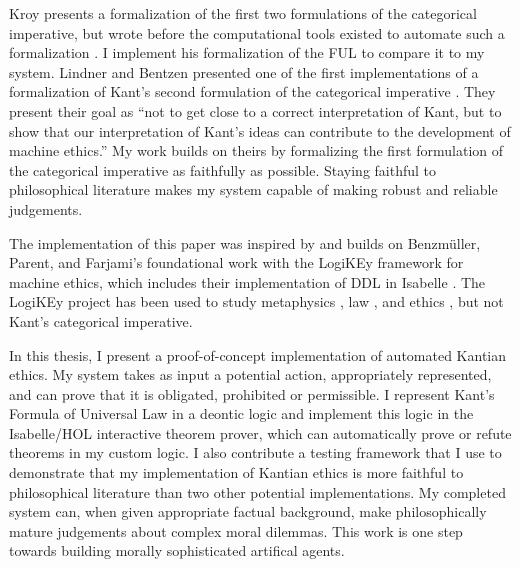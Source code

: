 \begin{isabellebody}
\begin{isamarkuptext}
Kroy presents a formalization of the first two formulations of the categorical imperative, but wrote 
before the computational tools existed to automate such a formalization \citep{kroy}. I implement his formalization of the FUL to compare it to my system. 
Lindner and Bentzen presented one of the first implementations of a formalization of 
Kant's second formulation of the categorical imperative \citep{BL}. They present their goal as ``not to get 
close to a correct interpretation of Kant, but to show that our interpretation of Kant’s ideas can 
contribute to the development of machine ethics.'' My work builds on theirs by formalizing the 
first formulation of the categorical imperative as faithfully as possible. Staying faithful to 
philosophical literature makes my system capable of making robust and reliable judgements. 

The implementation of this paper was inspired by and builds on Benzmüller, Parent, and Farjami's 
foundational work with the LogiKEy framework for machine ethics, which includes their implementation 
of DDL in Isabelle \citep{BFP, logikey}. The LogiKEy project has been used to study metaphysics 
\citep{godel, metaphysics1}, law \citep{constitution}, and ethics \citep{gewirth}, but not 
Kant's categorical imperative.%
\end{isamarkuptext}\isamarkuptrue%
%
\isadelimdocument
%
\endisadelimdocument
%
\isatagdocument
%
\isamarkuptrue%
%
\endisatagdocument
{\isafolddocument}%
%
\isadelimdocument
%
\endisadelimdocument
%
\begin{isamarkuptext}%
In this thesis, I present a proof-of-concept implementation of automated Kantian ethics. My system
takes as input a potential action, appropriately represented, and can prove that it is obligated, 
prohibited or permissible. I represent Kant's Formula of Universal Law in a deontic logic and 
implement this logic in the Isabelle/HOL interactive theorem prover, which can automatically prove or 
refute theorems in my custom logic. I also contribute a testing framework that I use to demonstrate that
my implementation of Kantian ethics is more faithful to philosophical literature than two other 
potential implementations. My completed system can, when given appropriate factual background, make
philosophically mature judgements about complex moral dilemmas. This work is one step towards building 
morally sophisticated artifical agents.


\end{isamarkuptext}
\end{isabellebody}
